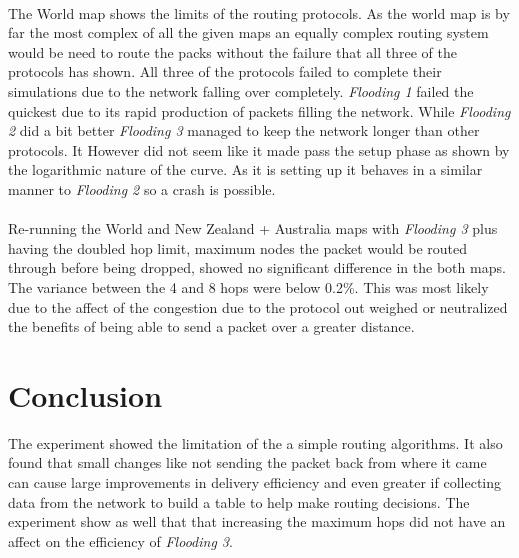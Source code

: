 \documentclass[11pt]{article}
\begin{document}
\paragraph{}
The World map shows the limits of the routing protocols. As the world map is by
far the most complex of all the given maps an equally complex routing system
would be need to route the packs without the failure that all three of the
protocols has shown. All three of the protocols failed to complete their
simulations due to the network falling over completely. \emph{Flooding 1}
failed the quickest due to its rapid production of packets filling the network.
While \emph{Flooding 2} did a bit better \emph{Flooding 3} managed to keep the
network longer than other protocols. It However did not seem like it made pass
the setup phase as shown by the logarithmic nature of the curve. As it is
setting up it behaves in a similar manner to \emph{Flooding 2} so a crash is
possible.

\paragraph{}
Re-running the World and New Zealand + Australia maps with \emph{Flooding 3}
plus having the doubled hop limit, maximum nodes the packet would be routed through
before being dropped, showed no significant difference in the both maps. The
variance between the 4 and 8 hops were below 0.2\%. This was most likely due to
the affect of the congestion due to the protocol out weighed or neutralized the
benefits of being able to send a packet over a greater distance.

\section{Conclusion}\label{conclusion}

The experiment showed the limitation of the a simple routing algorithms. It
also found that small changes like not sending the packet back from where it
came can cause large improvements in delivery efficiency and even greater if
collecting data from the network to build a table to help make routing
decisions. The experiment show as well that that increasing the maximum hops
did not have an affect on the efficiency of \emph{Flooding 3}.
\end{document}
